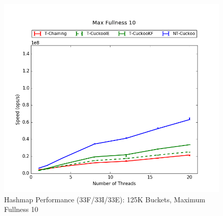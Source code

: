 \begin{figure}[H]
    \centering
	\begin{minipage}{0.5\textwidth}\includegraphics[width=\textwidth]{maps/10HM125K:F34,I33,E33.png} 
    \end{minipage}
	\begin{minipage}{0.4\textwidth}
    
    \end{minipage}
    \caption{Hashmap Performance (33F/33I/33E): 125K Buckets, Maximum Fullness 10}
\end{figure}

